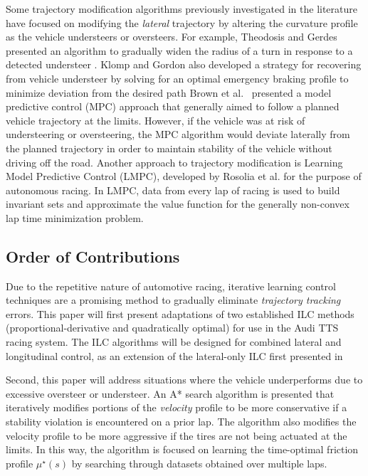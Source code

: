 \documentclass[9pt,shortpaper,twoside,web]{ieeecolor}
\begin{document}
Some trajectory modification algorithms previously investigated in
the literature have focused on modifying the \textit{lateral} trajectory by altering the curvature profile as the vehicle understeers or oversteers. For example, Theodosis and Gerdes presented an algorithm to gradually widen the radius of a turn in response to a detected understeer \cite{paulthesis}. Klomp and Gordon also developed a strategy for recovering from
vehicle understeer by solving for an optimal emergency braking profile to minimize deviation from the desired path \cite{klomp} Brown et al.~\cite{brown2017safe} presented a model predictive control (MPC) approach that generally aimed to follow a planned vehicle trajectory at the limits. However, if the vehicle was at risk of understeering or oversteering, the MPC algorithm would deviate laterally from the planned trajectory in order to maintain stability of the vehicle without driving off the road. Another approach to trajectory modification is Learning Model Predictive Control (LMPC), developed by Rosolia et al. \cite{rosolia2017autonomous} for the purpose of autonomous racing. In LMPC, data from every lap of racing is used to build invariant sets and approximate the value function for the generally non-convex lap time minimization problem.   

\subsection{Order of Contributions}

Due to the repetitive nature of automotive racing, iterative learning control techniques are a promising method to gradually eliminate \textit{trajectory tracking} errors. This paper will first present adaptations of two established ILC methods  
(proportional-derivative and quadratically optimal) for use in the Audi TTS racing system.  The ILC algorithms will be designed for combined lateral and longitudinal control, as an extension of the lateral-only ILC first presented in \cite{kapaniaacc}

Second, this paper will address situations where the vehicle underperforms due to excessive oversteer or understeer. An A* search algorithm is presented
that iteratively modifies portions of the \textit{velocity} profile to be more conservative if a stability violation is encountered on a prior lap. The algorithm also modifies the velocity profile to be more aggressive if the tires are not being actuated at the limits. In this way, the algorithm is focused on learning the time-optimal friction profile $\mu^\star(s)$ by searching through datasets obtained over multiple laps. 
\end{document}
